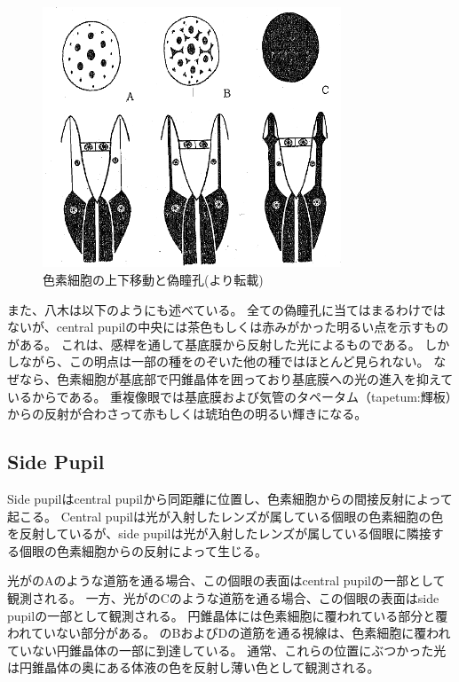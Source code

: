 \begin{figure}[htn]
  \centering
  \includegraphics[width=3.5in]{./img/yagi4-3types.png}
  \caption{色素細胞の上下移動と偽瞳孔(\cite{yagi1958studies}より転載)}
  \label{FYagi4-3types}
\end{figure}

また、八木は以下のようにも述べている。
全ての偽瞳孔に当てはまるわけではないが、central pupilの中央には茶色もしくは赤みがかった明るい点を示すものがある。
これは、感桿を通して基底膜から反射した光によるものである。
しかしながら、この明点は一部の種をのぞいた他の種ではほとんど見られない。
なぜなら、色素細胞が基底部で円錐晶体を囲っており基底膜への光の進入を抑えているからである。
重複像眼では基底膜および気管のタペータム（tapetum:輝板）からの反射が合わさって赤もしくは琥珀色の明るい輝きになる。

\subsection{Side Pupil}
\label{SSSidePupil}

Side pupilはcentral pupilから同距離に位置し、色素細胞からの間接反射によって起こる。
Central pupilは光が入射したレンズが属している個眼の色素細胞の色を反射しているが、side pupilは光が入射したレンズが属している個眼に隣接する個眼の色素細胞からの反射によって生じる\cite{yagi1951studies}。

光がのAのような道筋を通る場合、この個眼の表面はcentral pupilの一部として観測される。
一方、光がのCのような道筋を通る場合、この個眼の表面はside pupilの一部として観測される。
円錐晶体には色素細胞に覆われている部分と覆われていない部分がある。
のBおよびDの道筋を通る視線は、色素細胞に覆われていない円錐晶体の一部に到達している。
通常、これらの位置にぶつかった光は円錐晶体の奥にある体液の色を反射し薄い色として観測される\cite{yagi1951studies}。

